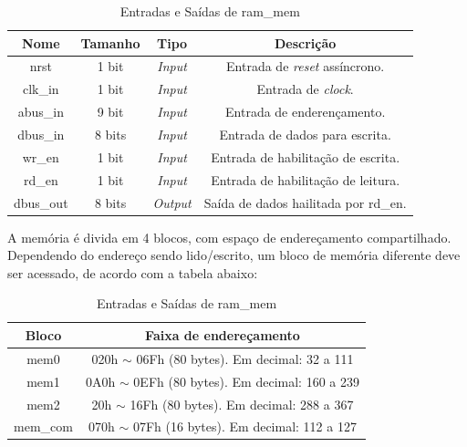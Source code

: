 \documentclass{article}
\begin{document}
\begin{table}[ht]
    \begin{center}
        \begin{tabular}{|c|c|c|c|}
            \hline
            Nome & Tamanho & Tipo & Descrição\\
            \hline
            nrst & 1 bit & \textit{Input} & Entrada de \textit{reset} assíncrono.\\
            \hline
            clk\_in & 1 bit & \textit{Input} & Entrada de \textit{clock}.\\
            \hline
            abus\_in & 9 bit & \textit{Input} & Entrada de enderençamento.\\
            \hline
            dbus\_in & 8 bits & \textit{Input} & Entrada de dados para escrita.\\
            \hline
            wr\_en & 1 bit & \textit{Input} & Entrada de habilitação de escrita.\\
            \hline
            rd\_en & 1 bit & \textit{Input} & Entrada de habilitação de leitura.\\
            \hline
            dbus\_out & 8 bits & \textit{Output} & Saída de dados hailitada por rd\_en.\\
            \hline
        \end{tabular}
    \end{center}
    \caption{Entradas e Saídas de ram\_mem}
\end{table}

A memória é divida em 4 blocos, com espaço de endereçamento compartilhado. Dependendo do endereço sendo lido/escrito, um bloco de memória diferente deve ser acessado, de acordo com a tabela abaixo:

\begin{table}[ht]
    \begin{center}
        \begin{tabular}{|c|c|}
            \hline
            Bloco & Faixa de endereçamento \\
            \hline
            mem0 & 020h $\sim$ 06Fh (80 bytes). Em decimal: 32 a 111 \\
            \hline
            mem1 & 0A0h $\sim$ 0EFh (80 bytes). Em decimal: 160 a 239 \\
            \hline
            mem2 & 20h $\sim$ 16Fh (80 bytes). Em decimal: 288 a 367 \\
            \hline
            mem\_com & 070h $\sim$ 07Fh (16 bytes). Em decimal: 112 a 127 \\
            \hline
        \end{tabular}
    \end{center}
    \caption{Entradas e Saídas de ram\_mem}
\end{table}
\end{document}
